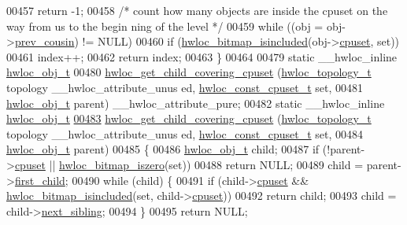 \begin{DoxyCode}
00457     \textcolor{keywordflow}{return} -1;
00458   \textcolor{comment}{/* count how many objects are inside the cpuset on the way from us to the begin
      ning of the level */}
00459   \textcolor{keywordflow}{while} ((obj = obj->\hyperlink{a00016_ac715989f55ff5a0eb6be2969ee477ec0}{prev_cousin}) != NULL)
00460     \textcolor{keywordflow}{if} (\hyperlink{a00065_gaae29e14a926c198e8f91e6e4790621e7}{hwloc_bitmap_isincluded}(obj->\hyperlink{a00016_a67925e0f2c47f50408fbdb9bddd0790f}{cpuset}, \textcolor{keyword}{set}))
00461       index++;
00462   \textcolor{keywordflow}{return} index;
00463 \}
00464 
00479 \textcolor{keyword}{static} \_\_hwloc\_inline \hyperlink{a00016}{hwloc_obj_t}
00480 \hyperlink{a00055_ga69a22cc76c88115aee7b7e6fc53fca7d}{hwloc_get_child_covering_cpuset} (\hyperlink{a00039_ga9d1e76ee15a7dee158b786c30b6a6e38}{hwloc_topology_t} topology \_\_hwloc\_attribute\_unus
      ed, \hyperlink{a00040_ga1f784433e9b606261f62d1134f6a3b25}{hwloc_const_cpuset_t} \textcolor{keyword}{set},
00481                                 \hyperlink{a00016}{hwloc_obj_t} parent) \_\_hwloc\_attribute\_pure;
00482 \textcolor{keyword}{static} \_\_hwloc\_inline \hyperlink{a00016}{hwloc_obj_t}
\hypertarget{a00031_source_l00483}{}\hyperlink{a00055_ga69a22cc76c88115aee7b7e6fc53fca7d}{00483} \hyperlink{a00055_ga69a22cc76c88115aee7b7e6fc53fca7d}{hwloc_get_child_covering_cpuset} (\hyperlink{a00039_ga9d1e76ee15a7dee158b786c30b6a6e38}{hwloc_topology_t} topology \_\_hwloc\_attribute\_unus
      ed, \hyperlink{a00040_ga1f784433e9b606261f62d1134f6a3b25}{hwloc_const_cpuset_t} \textcolor{keyword}{set},
00484                                 \hyperlink{a00016}{hwloc_obj_t} parent)
00485 \{
00486   \hyperlink{a00016}{hwloc_obj_t} child;
00487   \textcolor{keywordflow}{if} (!parent->\hyperlink{a00016_a67925e0f2c47f50408fbdb9bddd0790f}{cpuset} || \hyperlink{a00065_gaa94fed35d2a598bc4a8657b6955b7bf5}{hwloc_bitmap_iszero}(\textcolor{keyword}{set}))
00488     \textcolor{keywordflow}{return} NULL;
00489   child = parent->\hyperlink{a00016_af51d08a0a79dba517c06c5afedc8d2dc}{first_child};
00490   \textcolor{keywordflow}{while} (child) \{
00491     \textcolor{keywordflow}{if} (child->\hyperlink{a00016_a67925e0f2c47f50408fbdb9bddd0790f}{cpuset} && \hyperlink{a00065_gaae29e14a926c198e8f91e6e4790621e7}{hwloc_bitmap_isincluded}(\textcolor{keyword}{set}, child->\hyperlink{a00016_a67925e0f2c47f50408fbdb9bddd0790f}{cpuset}))
00492       \textcolor{keywordflow}{return} child;
00493     child = child->\hyperlink{a00016_a7f2343ed476fe4942e6fffd4cade1b40}{next_sibling};
00494   \}
00495   \textcolor{keywordflow}{return} NULL;

\end{DoxyCode}
